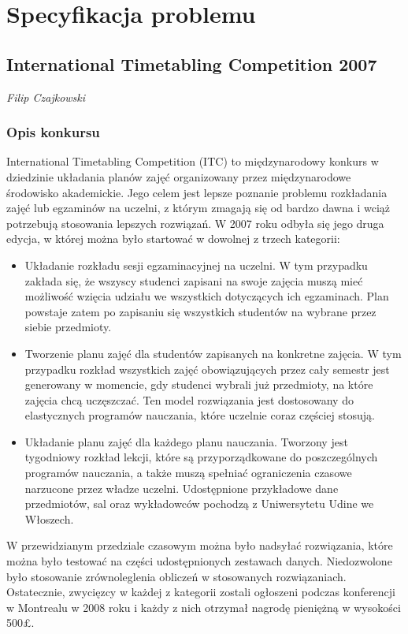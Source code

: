 \chapter{Specyfikacja problemu}
\section{International Timetabling Competition 2007}
\textit{Filip Czajkowski} \\
\subsection{Opis konkursu}
\par International Timetabling Competition (ITC) \cite{itc2007} to międzynarodowy konkurs w dziedzinie układania planów zajęć organizowany przez międzynarodowe środowisko akademickie. Jego celem jest lepsze poznanie problemu rozkładania zajęć lub egzaminów na uczelni, z którym zmagają się od bardzo dawna i wciąż potrzebują stosowania lepszych rozwiązań. W 2007 roku odbyła się jego druga edycja, w której można było startować w dowolnej z trzech kategorii: 
\begin{itemize}
\item Układanie rozkładu sesji egzaminacyjnej na uczelni. W tym przypadku zakłada się, że wszyscy studenci zapisani na swoje zajęcia muszą mieć możliwość wzięcia udziału we wszystkich dotyczących ich egzaminach. Plan powstaje zatem po zapisaniu się wszystkich studentów na wybrane przez siebie przedmioty.
\item Tworzenie planu zajęć dla studentów zapisanych na konkretne zajęcia. W tym przypadku rozkład wszystkich zajęć obowiązujących przez cały semestr jest generowany w momencie, gdy studenci wybrali już przedmioty, na które zajęcia chcą uczęszczać. Ten model rozwiązania jest dostosowany do elastycznych programów nauczania, które uczelnie coraz częściej stosują.
\item Układanie planu zajęć dla każdego planu nauczania. Tworzony jest tygodniowy rozkład lekcji, które są przyporządkowane do poszczególnych programów nauczania, a także muszą spełniać ograniczenia czasowe narzucone przez władze uczelni. Udostępnione przykładowe dane przedmiotów, sal oraz wykładowców pochodzą z Uniwersytetu Udine we Włoszech.
\end{itemize}
W przewidzianym przedziale czasowym można było nadsyłać rozwiązania, które można było testować na części udostępnionych zestawach danych. Niedozwolone było stosowanie zrównoleglenia obliczeń w stosowanych rozwiązaniach. Ostatecznie, zwycięzcy w każdej z kategorii zostali ogłoszeni podczas konferencji w Montrealu w 2008 roku i każdy z nich otrzymał nagrodę pieniężną w wysokości 500\pounds .
